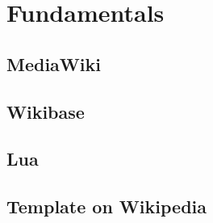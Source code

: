 \section{Fundamentals}
	
	
	\subsection{MediaWiki}
	\subsection{Wikibase} 
	\subsection{Lua}
	\subsection{Template on Wikipedia}
